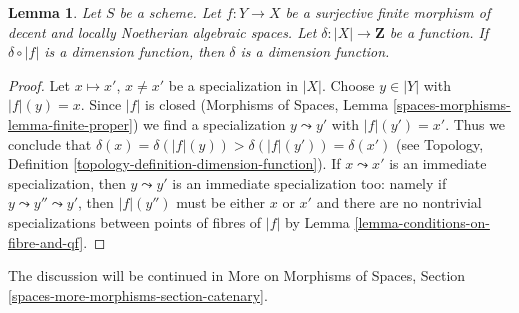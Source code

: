 \documentclass{stacks-project}
\theoremstyle{plain}
\newtheorem{lemma}[subsection]{Lemma}
\theoremstyle{definition}
\theoremstyle{remark}
\numberwithin{equation}{subsection}
\begin{document}
\begin{lemma}
\label{lemma-check-dimension-function-finite-cover}
Let $S$ be a scheme. Let $f : Y \to X$ be a surjective finite morphism of
decent and locally Noetherian algebraic spaces. Let
$\delta : |X| \to \mathbf{Z}$ be a function. If $\delta \circ |f|$ is a
dimension function, then $\delta$ is a dimension function.
\end{lemma}

\begin{proof}
Let $x \mapsto x'$, $x \not = x'$ be a specialization in $|X|$.
Choose $y \in |Y|$ with $|f|(y) = x$. Since $|f|$ is closed
(Morphisms of Spaces, Lemma \ref{spaces-morphisms-lemma-finite-proper})
we find a specialization $y \leadsto y'$ with $|f|(y') = x'$.
Thus we conclude that
$\delta(x) = \delta(|f|(y)) > \delta(|f|(y')) = \delta(x')$
(see Topology, Definition \ref{topology-definition-dimension-function}).
If $x \leadsto x'$ is an immediate specialization, then
$y \leadsto y'$ is an immediate specialization too:
namely if $y \leadsto y'' \leadsto y'$, then $|f|(y'')$
must be either $x$ or $x'$ and there are no nontrivial
specializations between points of fibres of $|f|$ by
Lemma \ref{lemma-conditions-on-fibre-and-qf}.
\end{proof}

\noindent
The discussion will be continued in
More on Morphisms of Spaces, Section
\ref{spaces-more-morphisms-section-catenary}.














\end{document}
